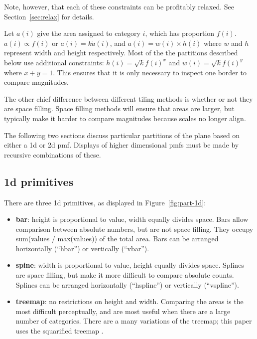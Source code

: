 \documentclass[letterpaper,oneside]{scrartcl}
\begin{document}
Note, however, that each of these constraints can be profitably relaxed.  See Section~\ref{sec:relax} for details.

Let $a(i)$ give the area assigned to category $i$, which has proportion $f(i)$.  $a(i) \propto f(i)$ or $a(i) = k \dot a(i)$, and $a(i) = w(i) \times h(i)$ where $w$ and $h$ represent width and height respectively.  Most of the the partitions described below use additional constraints: $h(i) = \sqrt{k} f(i)^x$ and $w(i) = \sqrt{k} f(i)^y$ where $x + y = 1$.  This ensures that it is only necessary to inspect one border to compare magnitudes.

The other chief difference between different tiling methods is whether or not they are space filling.  Space filling methods will ensure that areas are larger, but typically make it harder to compare magnitudes because scales no longer align.

The following two sections discuss particular partitions of the plane based on either a 1d or 2d pmf.  Displays of higher dimensional pmfs must be made by recursive combinations of these.  

\subsection{1d primitives}

There are three 1d primitives, as displayed in Figure~\ref{fig:part-1d}:

\begin{itemize}
  \item {\bf bar}: height is proportional to value, width equally divides space. Bars allow comparison between absolute numbers, but are not space filling.  They occupy sum(values / max(values)) of the total area.  Bars can be arranged horizontally (``hbar'') or vertically (``vbar'').

  \item {\bf spine}: width is proportional to value, height equally divides space. Splines are space filling, but make it more difficult to compare absolute counts.  Splines can be arranged horizontally (``hspline'') or vertically (``vspline'').

  \item {\bf treemap}: no restrictions on height and width. Comparing the areas is the most difficult perceptually, and are most useful when there are a large number of categories.  There are a many variations of the treemap; this paper uses the squarified treemap \citep{bruls:1999}.

\end{itemize}
\end{document}
